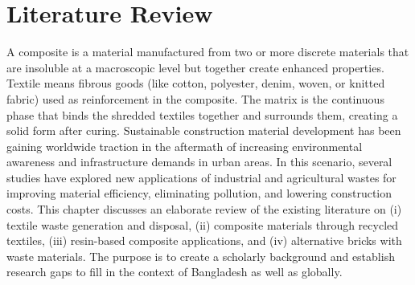 \chapter{Literature Review }
A composite is a material manufactured from two or more discrete materials that are insoluble at a macroscopic level but together create enhanced properties. Textile means fibrous goods (like cotton, polyester, denim, woven, or knitted fabric) used as reinforcement in the composite. The matrix is the continuous phase that binds the shredded textiles together and surrounds them, creating a solid form after curing. Sustainable construction material development has been gaining worldwide traction in the aftermath of increasing environmental awareness and infrastructure demands in urban areas. In this scenario, several studies have explored new applications of industrial and agricultural wastes for improving material efficiency, eliminating pollution, and lowering construction costs. This chapter discusses an elaborate review of the existing literature on (i) textile waste generation and disposal, (ii) composite materials through recycled textiles, (iii) resin-based composite applications, and (iv) alternative bricks with waste materials. The purpose is to create a scholarly background and establish research gaps to fill in the context of Bangladesh as well as globally. 



